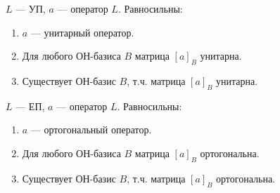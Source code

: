 \begin{cor}
    $L$ --- УП, $a$ --- оператор $L$. Равносильны:
    \begin{enumerate}
        \item $a$ --- унитарный оператор.
        \item Для любого ОН-базиса $B$ матрица $[a]_B$ унитарна.
        \item Существует ОН-базис $B$, т.ч. матрица $[a]_B$ унитарна.
    \end{enumerate}
\end{cor}

\begin{cor}
    $L$ --- ЕП, $a$ --- оператор $L$. Равносильны:
    \begin{enumerate}
        \item $a$ --- ортогональный оператор.
        \item Для любого ОН-базиса $B$ матрица $[a]_B$ ортогональна.
        \item Существует ОН-базис $B$, т.ч. матрица $[a]_B$ ортогональна.
    \end{enumerate}
\end{cor}